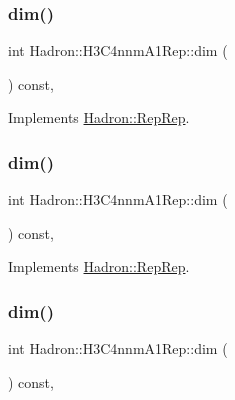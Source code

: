 \subsubsection{\texorpdfstring{dim()}{dim()}\hspace{0.1cm}{\footnotesize\ttfamily [3/5]}}
{\footnotesize\ttfamily int Hadron\+::\+H3\+C4nnm\+A1\+Rep\+::dim (\begin{DoxyParamCaption}{ }\end{DoxyParamCaption}) const\hspace{0.3cm}{\ttfamily [inline]}, {\ttfamily [virtual]}}



Implements \mbox{\hyperlink{structHadron_1_1RepRep_a92c8802e5ed7afd7da43ccfd5b7cd92b}{Hadron\+::\+Rep\+Rep}}.

\mbox{\label{structHadron_1_1H3C4nnmA1Rep_adf33664a42201319ff91ef407bcafa44}} 
\subsubsection{\texorpdfstring{dim()}{dim()}\hspace{0.1cm}{\footnotesize\ttfamily [4/5]}}
{\footnotesize\ttfamily int Hadron\+::\+H3\+C4nnm\+A1\+Rep\+::dim (\begin{DoxyParamCaption}{ }\end{DoxyParamCaption}) const\hspace{0.3cm}{\ttfamily [inline]}, {\ttfamily [virtual]}}



Implements \mbox{\hyperlink{structHadron_1_1RepRep_a92c8802e5ed7afd7da43ccfd5b7cd92b}{Hadron\+::\+Rep\+Rep}}.

\mbox{\label{structHadron_1_1H3C4nnmA1Rep_adf33664a42201319ff91ef407bcafa44}} 
\subsubsection{\texorpdfstring{dim()}{dim()}\hspace{0.1cm}{\footnotesize\ttfamily [5/5]}}
{\footnotesize\ttfamily int Hadron\+::\+H3\+C4nnm\+A1\+Rep\+::dim (\begin{DoxyParamCaption}{ }\end{DoxyParamCaption}) const\hspace{0.3cm}{\ttfamily [inline]}, {\ttfamily [virtual]}}



